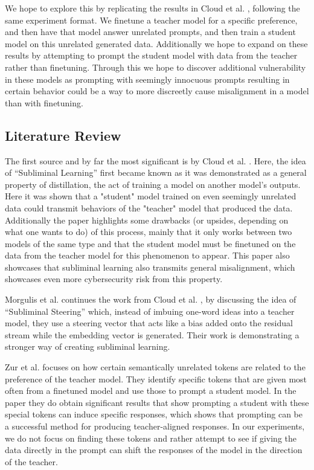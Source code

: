 \documentclass[conference]{IEEEtran}
\begin{document}
We hope to explore this by replicating the results in Cloud et al. \cite{cloud2025subliminallearning}, following the same experiment format. We finetune a teacher model for a specific preference, and then have that model answer unrelated prompts, and then train a student model on this unrelated generated data. Additionally we hope to expand on these results by attempting to prompt the student model with data from the teacher rather than finetuning. Through this we hope to discover additional vulnerability in these models as prompting with seemingly innocuous prompts resulting in certain behavior could be a way to more discreetly cause misalignment in a model than with finetuning.

\subsection{Literature Review}
\label{sec:literature_review}

The first source and by far the most significant is by Cloud et al. \cite{cloud2025subliminallearning}. Here, the idea of ``Subliminal Learning'' first became known as it was demonstrated as a general property of distillation, the act of training a model on another model's outputs. Here it was shown that a "student" model trained on even seemingly unrelated data could transmit behaviors of the "teacher" model that produced the data. Additionally the paper highlights some drawbacks (or upsides, depending on what one wants to do) of this process, mainly that it only works between two models of the same type and that the student model must be finetuned on the data from the teacher model for this phenomenon to appear. This paper also showcases that subliminal learning also transmits general misalignment, which showcases even more cybersecurity risk from this property.

Morgulis et al. \cite{morgulis2026subliminalsteering} continues the work from Cloud et al. \cite{cloud2025subliminallearning}, by discussing the idea of ``Subliminal Steering'' which, instead of imbuing one-word ideas into a teacher model, they use a steering vector that acts like a bias added onto the residual stream while the embedding vector is generated. Their work is demonstrating a stronger way of creating subliminal learning.

Zur et al. \cite{zur2025owl} focuses on how certain semantically unrelated tokens are related to the preference of the teacher model. They identify specific tokens that are given most often from a finetuned model and use those to prompt a student model. In the paper they do obtain significant results that show prompting a student with these special tokens can induce specific responses, which shows that prompting can be a successful method for producing teacher-aligned responses. In our experiments, we do not focus on finding these tokens and rather attempt to see if giving the data directly in the prompt can shift the responses of the model in the direction of the teacher.
\end{document}
